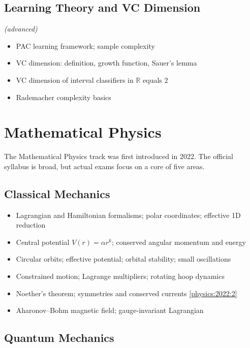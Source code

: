 \subsection{Learning Theory and VC Dimension} \textit{(advanced)}

\begin{itemize}
  \item PAC learning framework; sample complexity
  \item VC dimension: definition, growth function, Sauer's lemma
  \item VC dimension of interval classifiers in $\mathbb{R}$ equals 2
  \item Rademacher complexity basics
\end{itemize}

\section{Mathematical Physics}
\label{sec:prep-physics}

The Mathematical Physics track was first introduced in 2022. The official syllabus is broad, but actual exams focus on a core of five areas.

\subsection{Classical Mechanics}

\begin{itemize}
  \item Lagrangian and Hamiltonian formalisms; polar coordinates; effective 1D reduction
  \item Central potential $V(r)=\alpha r^k$; conserved angular momentum and energy
  \item Circular orbits; effective potential; orbital stability; small oscillations
  \item Constrained motion; Lagrange multipliers; rotating hoop dynamics
  \item Noether's theorem; symmetries and conserved currents \hfill \cref{physics:2022:2}
  \item Aharonov--Bohm magnetic field; gauge-invariant Lagrangian
\end{itemize}

\subsection{Quantum Mechanics}

